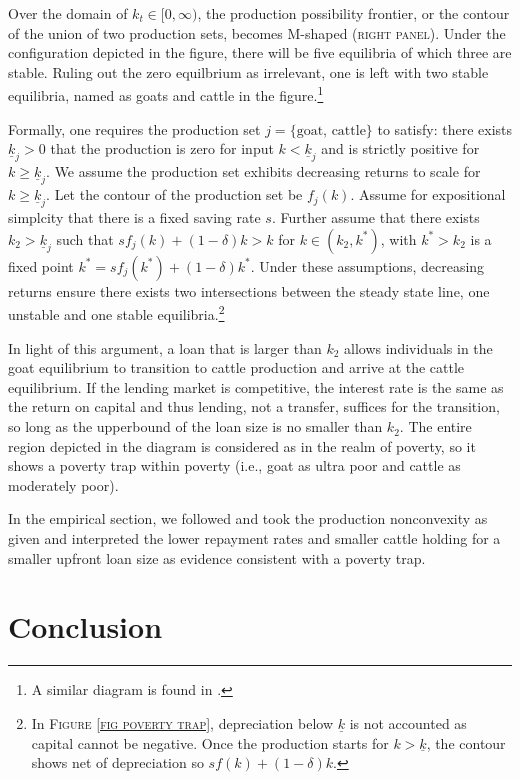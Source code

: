 	Over the domain of $k_{t}\in[0, \infty)$, the production possibility frontier, or the contour of the union of two production sets, becomes M-shaped (\textsc{right panel}). Under the configuration depicted in the figure, there will be five equilibria of which three are stable. Ruling out the zero equilbrium as irrelevant, one is left with two stable equilibria, named as goats and cattle in the figure.\footnote{A similar diagram is found in \citet[][Figure 3, with $k-y$ space]{KraayMcKenzie2014}. }

	Formally, one requires the production set $j=\{\mbox{goat, cattle}\}$ to satisfy: there exists $\underline{k}_{j}>0$ that the production is zero for input $k<\underline{k}_{j}$ and is strictly positive for $k\geqslant\underline{k}_{j}$. We assume the production set exhibits decreasing returns to scale for $k\geqslant\underline{k}_{j}$. Let the contour of the production set be $f_{j}(k)$. Assume for expositional simplcity that there is a fixed saving rate $s$. Further assume that there exists $k_{2}>\underline{k}_{j}$ such that $sf_{j}(k)+(1-\delta)k>k$ for $k\in(k_{2}, k^{*})$, with $k^{*}>k_{2}$ is a fixed point $k^{*}=sf_{j}(k^{*})+(1-\delta)k^{*}$. Under these assumptions, decreasing returns ensure there exists two intersections between the steady state line, one unstable and one stable equilibria.\footnote{In \textsc{Figure \ref{fig poverty trap}}, depreciation below $\underline{k}$ is not accounted as capital cannot be negative. Once the production starts for $k>\underline{k}$, the contour shows net of depreciation so $sf(k)+(1-\delta)k$. } 

	In light of this argument, a loan that is larger than $k_{2}$ allows individuals in the goat equilibrium to transition to cattle production and arrive at the cattle equilibrium. If the lending market is competitive, the interest rate is the same as the return on capital and thus lending, not a transfer, suffices for the transition, so long as the upperbound of the loan size is no smaller than $k_{2}$. The entire region depicted in the diagram is considered as in the realm of poverty, so it shows a poverty trap within poverty (i.e., goat as ultra poor and cattle as moderately poor). 

	In the empirical section, we followed \citet{BandieraBRAC2017} and took the production nonconvexity as given and interpreted the lower repayment rates and smaller cattle holding for a smaller upfront loan size as evidence consistent with a poverty trap. 

\section{Conclusion}
\label{SecConclusion}

